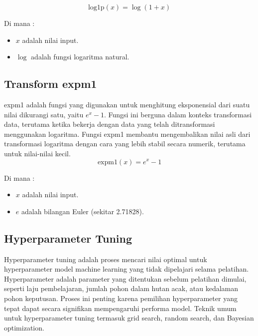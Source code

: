 \begin{equation}
    \text{log1p}(x) = \log(1 + x)
\end{equation}

Di mana :
\begin{itemize}
    \item $x$ adalah nilai input.
    \item $\log$ adalah fungsi logaritma natural.
\end{itemize}

\subsection{Transform expm1}
expm1 adalah fungsi yang digunakan untuk menghitung eksponensial dari suatu nilai dikurangi satu, yaitu $e^x - 1$. Fungsi ini berguna dalam konteks transformasi data, terutama ketika bekerja dengan data yang telah ditransformasi menggunakan logaritma. Fungsi expm1 membantu mengembalikan nilai asli dari transformasi logaritma dengan cara yang lebih stabil secara numerik, terutama untuk nilai-nilai kecil.
\begin{equation}
    \text{expm1}(x) = e^x - 1
\end{equation}

Di mana :
\begin{itemize}
    \item $x$ adalah nilai input.
    \item $e$ adalah bilangan Euler (sekitar 2.71828).
\end{itemize}

\subsection{Hyperparameter Tuning}

Hyperparameter tuning adalah proses mencari nilai optimal untuk hyperparameter model machine learning yang tidak dipelajari selama pelatihan. Hyperparameter adalah parameter yang ditentukan sebelum pelatihan dimulai, seperti laju pembelajaran, jumlah pohon dalam hutan acak, atau kedalaman pohon keputusan. Proses ini penting karena pemilihan hyperparameter yang tepat dapat secara signifikan mempengaruhi performa model. Teknik umum untuk hyperparameter tuning termasuk grid search, random search, dan Bayesian optimization.


